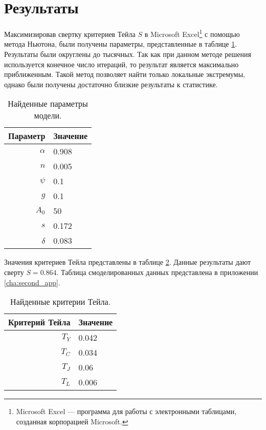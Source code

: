 \section{Результаты}

Максимизировав свертку критериев Тейла $S$ в Microsoft Excel\footnote{Microsoft Excel --- программа для работы с электронными таблицами, созданная корпорацией Microsoft.} с помощью метода Ньютона, были получены параметры, представленные в таблице \ref{tab::res_params}.
Результаты были округлены до тысячных.
Так как при данном методе решения используется конечное число итераций, то результат является максимально приближенным.
Такой метод позволяет найти только локальные экстремумы, однако были получены достаточно близкие результаты к статистике.

\begin{table}
	\centering
	\caption{Найденные параметры модели.}
	\label{tab::res_params}
	\begin{tabular}{|r|l|}
	\hline
	Параметр & Значение         \\ \hline
	$\alpha$ &      0.908       \\
	$n$      &      0.005       \\
	$\psi$   &      0.1         \\
	$g$      &      0.1         \\
	$A_0$    &      50          \\
	$s$      &      0.172       \\
	$\delta$ &      0.083       \\ \hline
	\end{tabular}%
\end{table}

Значения критериев Тейла представлены в таблице \ref{tab::res_crit_teil}.
Данные результаты дают сверту $S=0.864$.
Таблица смоделированных данных представлена в приложении \ref{cha:second_app}.

\begin{table}
	\centering
	\caption{Найденные критерии Тейла.}
	\label{tab::res_crit_teil}
	\begin{tabular}{|r|l|}
	\hline
	Критерий Тейла & Значение         \\ \hline
	$T_{Y}$        &      0.042       \\
	$T_{C}$        &      0.034       \\
	$T_{J}$        &      0.06        \\
	$T_{L}$        &      0.006       \\ \hline
	\end{tabular}%
\end{table}

